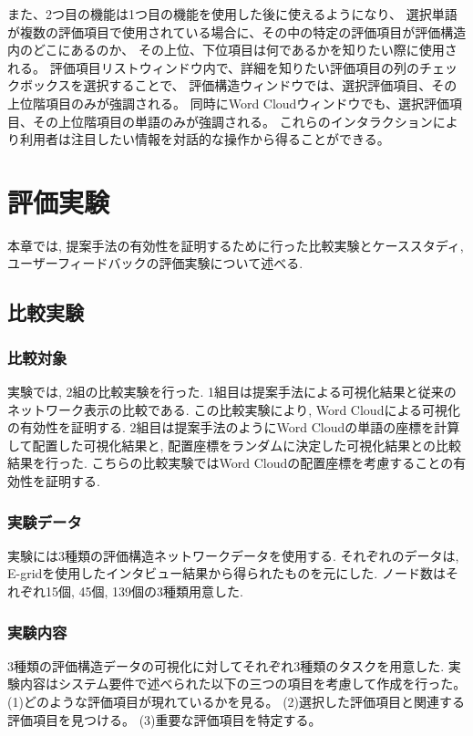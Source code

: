 \documentclass[syuuron]{kuee}
\begin{document}
			また、2つ目の機能は1つ目の機能を使用した後に使えるようになり、
			選択単語が複数の評価項目で使用されている場合に、その中の特定の評価項目が評価構造内のどこにあるのか、
			その上位、下位項目は何であるかを知りたい際に使用される。
			評価項目リストウィンドウ内で、詳細を知りたい評価項目の列のチェックボックスを選択することで、
			評価構造ウィンドウでは、選択評価項目、その上位階項目のみが強調される。
			同時にWord Cloudウィンドウでも、選択評価項目、その上位階項目の単語のみが強調される。
			これらのインタラクションにより利用者は注目したい情報を対話的な操作から得ることができる。
			

\chapter{評価実験}
	本章では, 提案手法の有効性を証明するために行った比較実験とケーススタディ, ユーザーフィードバックの評価実験について述べる. 
	\section{比較実験}
		\subsection{比較対象}
			実験では, 2組の比較実験を行った. 
			1組目は提案手法による可視化結果と従来のネットワーク表示の比較である. 
			この比較実験により, Word Cloudによる可視化の有効性を証明する. 
			2組目は提案手法のようにWord Cloudの単語の座標を計算して配置した可視化結果と, 配置座標をランダムに決定した可視化結果との比較結果を行った. 
			こちらの比較実験ではWord Cloudの配置座標を考慮することの有効性を証明する. 
			
		\subsection{実験データ}
			実験には3種類の評価構造ネットワークデータを使用する. 
			それぞれのデータは, E-gridを使用したインタビュー結果から得られたものを元にした. 
			ノード数はそれぞれ15個, 45個, 139個の3種類用意した. 
		
		\subsection{実験内容}
			3種類の評価構造データの可視化に対してそれぞれ3種類のタスクを用意した. 
			実験内容はシステム要件で述べられた以下の三つの項目を考慮して作成を行った。
			(1)どのような評価項目が現れているかを見る。
			(2)選択した評価項目と関連する評価項目を見つける。
			(3)重要な評価項目を特定する。
			
\end{document}
